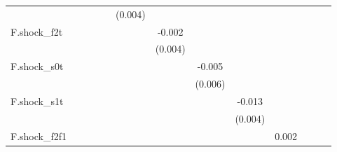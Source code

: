{\begin{tabular}{l*{12}{c}}
            &                     &                     &                     &                     &     (0.004)         &                     &                     &                     &                     &                     &                     &                     \\
\addlinespace
F.shock\_f2t &                     &                     &                     &                     &                     &      -0.002         &                     &                     &                     &                     &                     &                     \\
            &                     &                     &                     &                     &                     &     (0.004)         &                     &                     &                     &                     &                     &                     \\
\addlinespace
F.shock\_s0t &                     &                     &                     &                     &                     &                     &      -0.005         &                     &                     &                     &                     &                     \\
            &                     &                     &                     &                     &                     &                     &     (0.006)         &                     &                     &                     &                     &                     \\
\addlinespace
F.shock\_s1t &                     &                     &                     &                     &                     &                     &                     &      -0.013\sym{***}&                     &                     &                     &                     \\
            &                     &                     &                     &                     &                     &                     &                     &     (0.004)         &                     &                     &                     &                     \\
\addlinespace
F.shock\_f2f1&                     &                     &                     &                     &                     &                     &                     &                     &       0.002         &                     &                     &                     \\

\end{tabular}}

